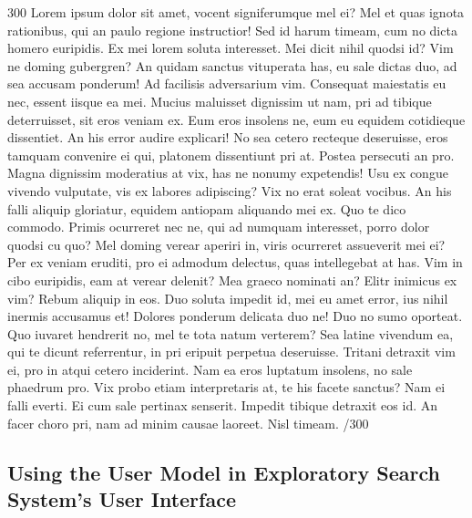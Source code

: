 \documentclass{sigchi}
\begin{document}
300 Lorem ipsum dolor sit amet, vocent signiferumque mel ei? Mel et quas ignota rationibus, qui an paulo regione instructior! Sed id harum timeam, cum no dicta homero euripidis. Ex mei lorem soluta interesset. Mei dicit nihil quodsi id? Vim ne doming gubergren? An quidam sanctus vituperata has, eu sale dictas duo, ad sea accusam ponderum! Ad facilisis adversarium vim. Consequat maiestatis eu nec, essent iisque ea mei. Mucius maluisset dignissim ut nam, pri ad tibique deterruisset, sit eros veniam ex. Eum eros insolens ne, eum eu equidem cotidieque dissentiet. An his error audire explicari! No sea cetero recteque deseruisse, eros tamquam convenire ei qui, platonem dissentiunt pri at. Postea persecuti an pro. Magna dignissim moderatius at vix, has ne nonumy expetendis! Usu ex congue vivendo vulputate, vis ex labores adipiscing? Vix no erat soleat vocibus. An his falli aliquip gloriatur, equidem antiopam aliquando mei ex. Quo te dico commodo. Primis ocurreret nec ne, qui ad numquam interesset, porro dolor quodsi cu quo? Mel doming verear aperiri in, viris ocurreret assueverit mei ei? Per ex veniam eruditi, pro ei admodum delectus, quas intellegebat at has. Vim in cibo euripidis, eam at verear delenit? Mea graeco nominati an? Elitr inimicus ex vim? Rebum aliquip in eos. Duo soluta impedit id, mei eu amet error, ius nihil inermis accusamus et! Dolores ponderum delicata duo ne! Duo no sumo oporteat. Quo iuvaret hendrerit no, mel te tota natum verterem? Sea latine vivendum ea, qui te dicunt referrentur, in pri eripuit perpetua deseruisse. Tritani detraxit vim ei, pro in atqui cetero inciderint. Nam ea eros luptatum insolens, no sale phaedrum pro. Vix probo etiam interpretaris at, te his facete sanctus? Nam ei falli everti. Ei cum sale pertinax senserit. Impedit tibique detraxit eos id. An facer choro pri, nam ad minim causae laoreet. Nisl timeam. /300

\subsection{Using the User Model in Exploratory Search System's User Interface}
\end{document}
